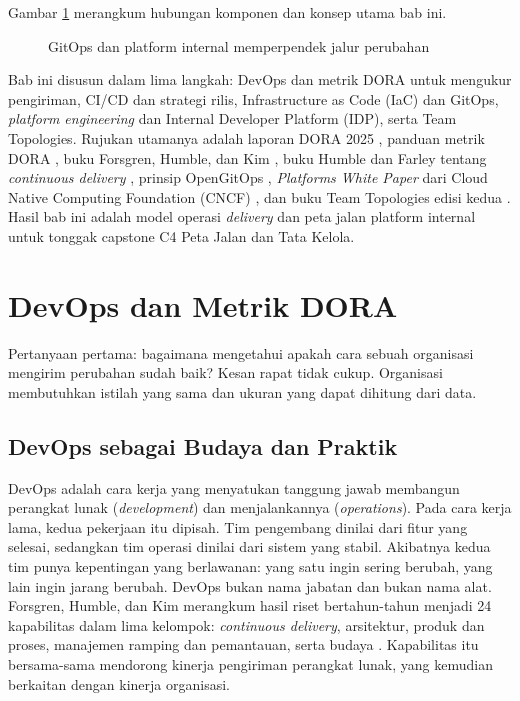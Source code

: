 Gambar \ref{fig:ch13-antrean-dan-jalur} merangkum hubungan komponen dan konsep utama bab ini.
\begin{figure}[!htb]
  \centering
  
  \caption{GitOps dan platform internal memperpendek jalur perubahan}
  \label{fig:ch13-antrean-dan-jalur}
\end{figure}

Bab ini disusun dalam lima langkah: DevOps dan metrik DORA untuk mengukur pengiriman, CI/CD dan
strategi rilis, Infrastructure as Code (IaC) dan GitOps, \textit{platform engineering} dan
Internal Developer Platform (IDP), serta Team Topologies. Rujukan utamanya adalah laporan DORA
2025 \cite{dora2025}, panduan metrik DORA \cite{dora-metrics}, buku Forsgren, Humble, dan Kim
\cite{c13-forsgren2018}, buku Humble dan Farley tentang \textit{continuous delivery}
\cite{c13-humble2010}, prinsip OpenGitOps \cite{opengitops}, \textit{Platforms White Paper} dari
Cloud Native Computing Foundation (CNCF) \cite{cncf-platforms}, dan buku Team Topologies edisi
kedua \cite{skelton2025}. Hasil bab ini adalah model operasi \textit{delivery} dan peta jalan
platform internal untuk tonggak capstone C4 Peta Jalan dan Tata Kelola.

\section{DevOps dan Metrik DORA}
\label{sec:ch13-dora}

Pertanyaan pertama: bagaimana mengetahui apakah cara sebuah organisasi mengirim perubahan sudah
baik? Kesan rapat tidak cukup. Organisasi membutuhkan istilah yang sama dan ukuran yang dapat
dihitung dari data.

\subsection{DevOps sebagai Budaya dan Praktik}

DevOps adalah cara kerja yang menyatukan tanggung jawab membangun perangkat lunak
(\textit{development}) dan menjalankannya (\textit{operations}). Pada cara kerja lama, kedua
pekerjaan itu dipisah. Tim pengembang dinilai dari fitur yang selesai, sedangkan tim operasi
dinilai dari sistem yang stabil. Akibatnya kedua tim punya kepentingan yang berlawanan: yang satu
ingin sering berubah, yang lain ingin jarang berubah. DevOps bukan nama jabatan dan bukan nama
alat. Forsgren, Humble, dan Kim merangkum hasil riset bertahun-tahun menjadi 24 kapabilitas dalam
lima kelompok: \textit{continuous delivery}, arsitektur, produk dan proses, manajemen ramping dan
pemantauan, serta budaya \cite{c13-forsgren2018}. Kapabilitas itu bersama-sama mendorong kinerja
pengiriman perangkat lunak, yang kemudian berkaitan dengan kinerja organisasi.

